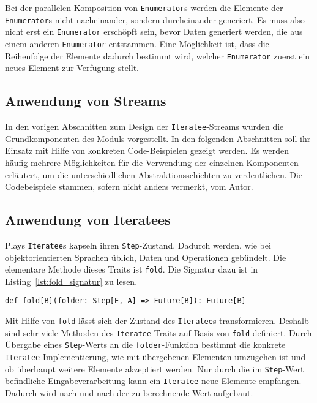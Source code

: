 Bei der parallelen Komposition von \lstinline|Enumerator|s werden die Elemente der \lstinline|Enumerator|s nicht nacheinander, sondern durcheinander generiert.
Es muss also nicht erst ein \lstinline|Enumerator| erschöpft sein, bevor Daten generiert werden, die aus einem anderen \lstinline|Enumerator| entstammen.
Eine Möglichkeit ist, dass die Reihenfolge der Elemente dadurch bestimmt wird, welcher \lstinline|Enumerator| zuerst ein neues Element zur Verfügung stellt. %




\subsection{Anwendung von Streams} %
\label{sub:anwendung}

In den vorigen Abschnitten zum Design der \lstinline|Iteratee|-Streams wurden die Grundkomponenten des Moduls vorgestellt.
In den folgenden Abschnitten soll ihr Einsatz mit Hilfe von konkreten Code-Beispielen gezeigt werden.
Es werden häufig mehrere Möglichkeiten für die Verwendung der einzelnen Komponenten erläutert, um die unterschiedlichen Abstraktionsschichten zu verdeutlichen.
Die Codebeispiele stammen, sofern nicht anders vermerkt, vom Autor.



\subsection{Anwendung von Iteratees} %
\label{sub:iteratees}

Plays \lstinline|Iteratee|s kapseln ihren \lstinline|Step|-Zustand.
Dadurch werden, wie bei objektorientierten Sprachen üblich, Daten und Operationen gebündelt.
Die elementare Methode dieses Traits ist \lstinline|fold|.
Die Signatur dazu ist in Listing~\ref{lst:fold_signatur} zu lesen.
\begin{lstlisting}[caption=Die Signatur von fold, label=lst:fold_signatur]
def fold[B](folder: Step[E, A] => Future[B]): Future[B]
\end{lstlisting}

Mit Hilfe von \lstinline|fold| lässt sich der Zustand des \lstinline|Iteratee|s transformieren.
Deshalb sind sehr viele Methoden des \lstinline|Iteratee|-Traits auf Basis von \lstinline|fold| definiert.
Durch Übergabe eines \lstinline|Step|-Werts an die \lstinline|folder|-Funktion bestimmt die konkrete \lstinline|Iteratee|-Implementierung, wie mit übergebenen Elementen umzugehen ist und ob überhaupt weitere Elemente akzeptiert werden.
Nur durch die im \lstinline|Step|-Wert befindliche Eingabeverarbeitung kann ein \lstinline|Iteratee| neue Elemente empfangen.
Dadurch wird nach und nach der zu berechnende Wert aufgebaut.

